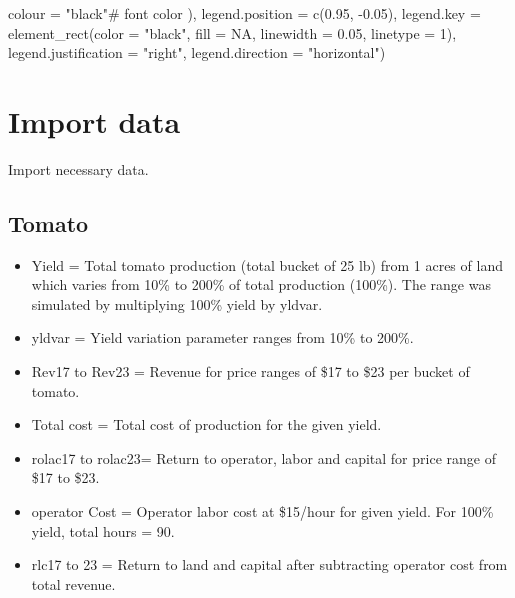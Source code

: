 \documentclass[
  letterpaper,
  DIV=11,
  numbers=noendperiod]{scrartcl}
\newenvironment{Shaded}{\begin{snugshade}}{\end{snugshade}}
\newcommand{\AttributeTok}[1]{\textcolor[rgb]{0.40,0.45,0.13}{#1}}
\newcommand{\CommentTok}[1]{\textcolor[rgb]{0.37,0.37,0.37}{#1}}
\newcommand{\ConstantTok}[1]{\textcolor[rgb]{0.56,0.35,0.01}{#1}}
\newcommand{\DecValTok}[1]{\textcolor[rgb]{0.68,0.00,0.00}{#1}}
\newcommand{\FloatTok}[1]{\textcolor[rgb]{0.68,0.00,0.00}{#1}}
\newcommand{\FunctionTok}[1]{\textcolor[rgb]{0.28,0.35,0.67}{#1}}
\newcommand{\NormalTok}[1]{\textcolor[rgb]{0.00,0.23,0.31}{#1}}
\newcommand{\SpecialCharTok}[1]{\textcolor[rgb]{0.37,0.37,0.37}{#1}}
\newcommand{\StringTok}[1]{\textcolor[rgb]{0.13,0.47,0.30}{#1}}
\begin{document}
\begin{Shaded}
\begin{Highlighting}[]
                            \AttributeTok{colour =} \StringTok{"black"}\CommentTok{\# font color}
\NormalTok{        ),}
        \AttributeTok{legend.position =} \FunctionTok{c}\NormalTok{(}\FloatTok{0.95}\NormalTok{, }\SpecialCharTok{{-}}\FloatTok{0.05}\NormalTok{),}
        \AttributeTok{legend.key =} \FunctionTok{element\_rect}\NormalTok{(}\AttributeTok{color =} \StringTok{"black"}\NormalTok{, }
                                  \AttributeTok{fill =} \ConstantTok{NA}\NormalTok{, }
                                  \AttributeTok{linewidth =} \FloatTok{0.05}\NormalTok{, }
                                  \AttributeTok{linetype =} \DecValTok{1}\NormalTok{),}
        \AttributeTok{legend.justification =} \StringTok{"right"}\NormalTok{,}
        \AttributeTok{legend.direction =} \StringTok{"horizontal"}\NormalTok{)}
\end{Highlighting}
\end{Shaded}

\section{Import data}\label{import-data}

Import necessary data.

\subsection{Tomato}\label{tomato}

\begin{itemize}
\item
  Yield = Total tomato production (total bucket of 25 lb) from 1 acres
  of land which varies from 10\% to 200\% of total production (100\%).
  The range was simulated by multiplying 100\% yield by yldvar.
\item
  yldvar = Yield variation parameter ranges from 10\% to 200\%.
\item
  Rev17 to Rev23 = Revenue for price ranges of \$17 to \$23 per bucket
  of tomato.
\item
  Total cost = Total cost of production for the given yield.
\item
  rolac17 to rolac23= Return to operator, labor and capital for price
  range of \$17 to \$23.
\item
  operator Cost = Operator labor cost at \$15/hour for given yield. For
  100\% yield, total hours = 90.
\item
  rlc17 to 23 = Return to land and capital after subtracting operator
  cost from total revenue.
\end{itemize}
\end{document}
